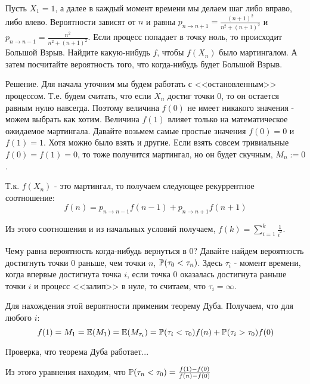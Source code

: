 {%






\begin{myex}
Пусть $X_{1}=1$, а далее в каждый момент времени мы делаем шаг либо вправо, либо влево. Вероятности зависят от $n$ и равны $p_{n\to n+1}=\frac{(n+1)^{2}}{n^{2}+(n+1)^{2}}$ и  $p_{n\to n-1}=\frac{n^{2}}{n^{2}+(n+1)^{2}}$. Если процесс попадает в точку ноль, то происходит Большой Взрыв. Найдите какую-нибудь $f$, чтобы $f(X_{n})$ было мартингалом. А затем посчитайте вероятность того, что когда-нибудь будет Большой Взрыв.

Решение. Для начала уточним мы будем работать с <<остановленным>> процессом. Т.е. будем считать, что если $X_{n}$ достиг точки $0$, то он остается равным нулю навсегда. Поэтому величина $f(0)$ не имеет никакого значения - можем выбрать как хотим. Величина $f(1)$ влияет только на математическое ожидаемое мартингала. Давайте возьмем самые простые значения $f(0)=0$ и $f(1)=1$. Хотя можно было взять и другие. Если взять совсем тривиальные $f(0)=f(1)=0$, то тоже получится мартингал, но он будет скучным, $M_{n}:=0$.

Т.к. $f(X_{n})$ - это мартингал, то получаем следующее рекуррентное соотношение:
\begin{equation}
f(n)=p_{n\to n-1} f(n-1)+p_{n\to n+1} f(n+1)
\end{equation}

Из этого соотношения и из начальных условий получаем, $f(k)=\sum_{i=1}^{k}\frac{1}{i^{2}}$.

Чему равна вероятность когда-нибудь вернуться в 0? Давайте найдем вероятность достигнуть точки $0$ раньше, чем точки $n$, $\P(\tau_{0}<\tau_{n})$. Здесь $\tau_{i}$ - момент времени, когда впервые достигнута точка $i$, если точка $0$ оказалась достигнута раньше точки $i$ и процесс <<залип>> в нуле, то считаем, что $\tau_{i}=\infty$.

Для нахождения этой вероятности применим теорему Дуба. Получаем, что для любого $i$:
\begin{equation}
f(1)=M_{1}=\E(M_{1})=\E(M_{\tau_{i}})=\P(\tau_{i}<\tau_{0})f(n)+\P(\tau_{i}>\tau_{0})f(0)
\end{equation}

Проверка, что теорема Дуба работает...

Из этого уравнения находим, что $\P(\tau_{n}<\tau_{0})=\frac{f(1)-f(0)}{f(n)-f(0)}$


\end{myex}}
